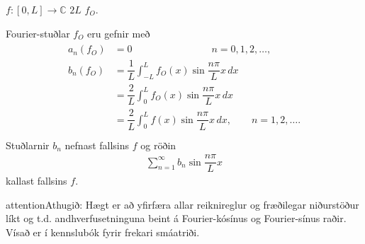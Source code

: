 \documentclass[a4paper,10pt,icelandic]{sphinxmanual}
\begin{document}

 \(f:[0,L]\to \mathbb{C}\)  \(2L\)  \(f_O\).

Fourier-stuðlar \(f_O\) eru gefnir með
\begin{equation*}
\begin{split}\begin{aligned}
 a_n(f_O)&=0 \qquad\qquad\qquad \qquad n=0,1,2,\dots,\\
 b_n(f_O)&=\dfrac 1L \int_{-L}^L f_O(x)\sin \dfrac {n\pi}L
 x  \, dx\\
 &=\dfrac 2L \int_{0}^L f_O(x)\sin \dfrac {n\pi}L
 x  \, dx\\
 &=\dfrac 2L \int_{0}^L f(x)\sin \dfrac {n\pi}L
 x  \, dx, \qquad n=1,2,\dots.\\\end{aligned}\end{split}
\end{equation*}
Stuðlarnir \(b_n\) nefnast  fallsins \(f\) og röðin
\begin{equation*}
\begin{split}\sum_{n=1}^\infty b_n \sin  \dfrac {n\pi} L x\end{split}
\end{equation*}
kallast  fallsins \(f\).

\begin{sphinxadmonition}{attention}{Athugið:}
Hægt er að yfirfæra allar reiknireglur og fræðilegar niðurstöður líkt og t.d. andhverfusetninguna beint á Fourier-kósínus og Fourier-sínus raðir. Vísað er í kennslubók fyrir frekari smáatriði.
\end{sphinxadmonition}
\end{document}

